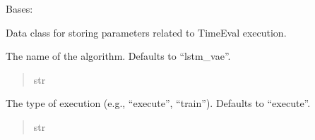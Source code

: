 \documentclass[letterpaper,10pt,english]{sphinxmanual}
\begin{document}
\begin{fulllineitems}
\label{\detokenize{application.services:application.services.TimeEvalWrapper.TimeEvalParameters}}
\pysigstartsignatures
{}
\pysigstopsignatures
\sphinxAtStartPar
Bases: 

\sphinxAtStartPar
Data class for storing parameters related to TimeEval execution.

\begin{fulllineitems}
\label{\detokenize{application.services:application.services.TimeEvalWrapper.TimeEvalParameters.name}}
\pysigstartsignatures
{}
\pysigstopsignatures
\sphinxAtStartPar
The name of the algorithm. Defaults to “lstm\_vae”.
\begin{quote}\begin{description}
\sphinxAtStartPar
str

\end{description}\end{quote}

\end{fulllineitems}


\begin{fulllineitems}
\label{\detokenize{application.services:application.services.TimeEvalWrapper.TimeEvalParameters.execution_type}}
\pysigstartsignatures
{}
\pysigstopsignatures
\sphinxAtStartPar
The type of execution (e.g., “execute”, “train”). Defaults to “execute”.
\begin{quote}\begin{description}
\sphinxAtStartPar
str


\end{description}
\end{quote}
\end{fulllineitems}
\end{fulllineitems}
\end{document}
